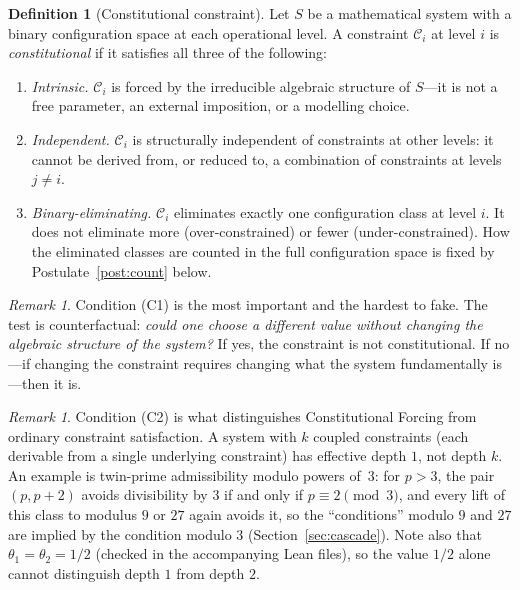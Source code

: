 \documentclass[12pt]{amsart}
\theoremstyle{plain}
\theoremstyle{definition}
\newtheorem{definition}[theorem]{Definition}
\theoremstyle{remark}
\newtheorem{remark}[theorem]{Remark}
\begin{document}
\begin{definition}[Constitutional constraint]
\label{def:constitutional}
Let $S$ be a mathematical system with a binary configuration space at each
operational level. A constraint $\mathcal{C}_i$ at level $i$ is
\emph{constitutional} if it satisfies all three of the following:
\begin{enumerate}[label=\textup{(C\arabic*)}]
  \item \emph{Intrinsic.} $\mathcal{C}_i$ is forced by the irreducible algebraic
    structure of $S$---it is not a free parameter, an external imposition, or
    a modelling choice.
  \item \emph{Independent.} $\mathcal{C}_i$ is structurally independent of
    constraints at other levels: it cannot be derived from, or reduced to, a
    combination of constraints at levels $j \neq i$.
  \item \emph{Binary-eliminating.} $\mathcal{C}_i$ eliminates exactly one
    configuration class at level $i$. It does not eliminate more
    (over-constrained) or fewer (under-constrained). How the eliminated
    classes are counted in the full configuration space is fixed by
    Postulate~\ref{post:count} below.
\end{enumerate}
\end{definition}

\begin{remark}
Condition (C1) is the most important and the hardest to fake. The test is
counterfactual: \emph{could one choose a different value without changing the
algebraic structure of the system?} If yes, the constraint is not constitutional.
If no---if changing the constraint requires changing what the system fundamentally
is---then it is.
\end{remark}

\begin{remark}
Condition (C2) is what distinguishes Constitutional Forcing from ordinary
constraint satisfaction. A system with $k$ coupled constraints (each derivable
from a single underlying constraint) has effective depth $1$, not depth $k$.
An example is twin-prime admissibility modulo powers of~$3$: for $p > 3$, the
pair $(p, p+2)$ avoids divisibility by $3$ if and only if $p \equiv 2 \pmod 3$,
and every lift of this class to modulus $9$ or $27$ again avoids it, so the
``conditions'' modulo $9$ and $27$ are implied by the condition modulo $3$
(Section~\ref{sec:cascade}). Note also that $\theta_1 = \theta_2 = 1/2$
(checked in the accompanying Lean files), so the value $1/2$ alone cannot
distinguish depth $1$ from depth $2$.
\end{remark}
\end{document}
